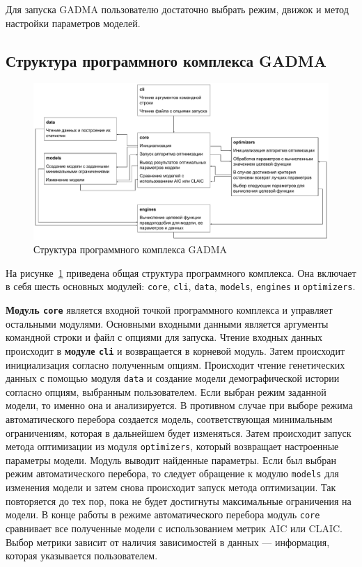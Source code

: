 Для запуска GADMA пользователю достаточно выбрать режим, движок и метод настройки параметров моделей.

\subsection{Структура программного комплекса GADMA}

\begin{figure}[ht]
    \centering
    \includegraphics[width=\linewidth]{images/part5/gadma_modules.pdf}
    \caption{Структура программного комплекса GADMA}
    \label{fig:part5:gadma_modules}
\end{figure}

На рисунке~\ref{fig:part5:gadma_modules} приведена общая структура программного комплекса.
Она включает в себя шесть основных модулей: \texttt{core}, \texttt{cli}, \texttt{data}, \texttt{models}, \texttt{engines} и \texttt{optimizers}.

\textbf{Модуль \texttt{core} }является входной точкой программного комплекса и управляет остальными модулями.
Основными входными данными является аргументы командной строки и файл с опциями для запуска.
Чтение входных данных происходит в \textbf{модуле \texttt{cli}} и возвращается в корневой модуль.
Затем происходит инициализация согласно полученным опциям.
Происходит чтение генетических данных с помощью модуля \texttt{data} и создание модели демографической истории согласно опциям, выбранным пользователем.
Если выбран режим заданной модели, то именно она и анализируется.
В противном случае при выборе режима автоматического перебора создается модель, соответствующая минимальным ограничениям, которая в дальнейшем будет изменяться.
Затем происходит запуск метода оптимизации из модуля \texttt{optimizers}, который возвращает настроенные параметры модели.
Модуль выводит найденные параметры.
Если был выбран режим автоматического перебора, то следует обращение к модулю \texttt{models} для изменения модели и затем снова происходит запуск метода оптимизации.
Так повторяется до тех пор, пока не будет достигнуты максимальные ограничения на модели.
В конце работы в режиме автоматического перебора модуль \texttt{core} сравнивает все полученные модели с использованием метрик AIC или CLAIC.
Выбор метрики зависит от наличия зависимостей в данных --- информация, которая указывается пользователем.

